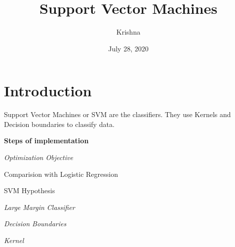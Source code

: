 \documentclass[a4paper,11pt]{article}
\begin{document}
\title{Support Vector Machines}
\author{Krishna}
\date{July 28, 2020}
\maketitle
\section{Introduction}
Support Vector Machines or SVM are the classifiers. 
They use Kernels and Decision boundaries to classify data.

\textbf{Steps of implementation}

\begin{compactenum}
\item\textit{Optimization Objective}
\begin{inparaenum}

    \item{Comparision with Logistic Regression}

    \item{SVM Hypothesis}

\end{inparaenum}

\item\textit{Large Margin Classifier}

\item \textit{Decision Boundaries}
\item \textit{Kernel}
\end{compactenum}
\end{document}
